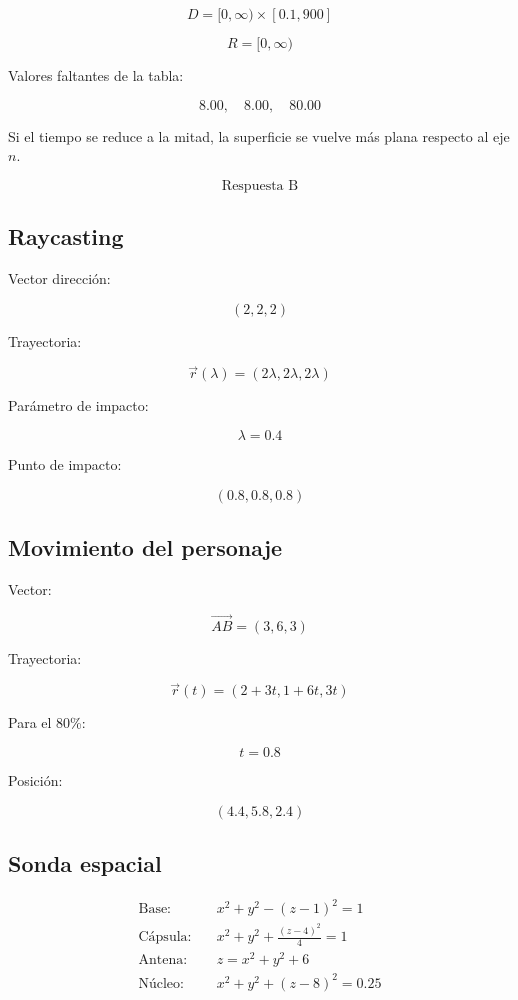 \documentclass[12pt,a4paper]{article}
\begin{document}
\[\boxed{D=[0,\infty)\times[0.1,900]}\]

\[\boxed{R=[0,\infty)}\]

Valores faltantes de la tabla:

\[\boxed{8.00,\quad8.00,\quad80.00}\]

Si el tiempo se reduce a la mitad, la superficie se vuelve más plana
respecto al eje $n$.

\[\boxed{\text{Respuesta B}}\]

\subsection{Raycasting}

Vector dirección:

\[\boxed{(2,2,2)}\]

Trayectoria:

\[\boxed{\vec{r}(\lambda)=(2\lambda,2\lambda,2\lambda)}\]

Parámetro de impacto:

\[\boxed{\lambda=0.4}\]

Punto de impacto:

\[\boxed{(0.8,0.8,0.8)}\]

\subsection{Movimiento del personaje}

Vector:

\[\boxed{\vec{AB}=(3,6,3)}\]

Trayectoria:

\[\boxed{\vec{r}(t)=(2+3t,1+6t,3t)}\]

Para el 80\%:

\[\boxed{t=0.8}\]

Posición:

\[\boxed{(4.4,5.8,2.4)}\]

\subsection{Sonda espacial}

\begin{align*}
\text{Base:}\quad
&\boxed{x^2+y^2-(z-1)^2=1}\\[0.3cm]
\text{Cápsula:}\quad
&\boxed{x^2+y^2+\frac{(z-4)^2}{4}=1}\\[0.3cm]
\text{Antena:}\quad
&\boxed{z=x^2+y^2+6}\\[0.3cm]
\text{Núcleo:}\quad
&\boxed{x^2+y^2+(z-8)^2=0.25}
\end{align*}
\end{document}
